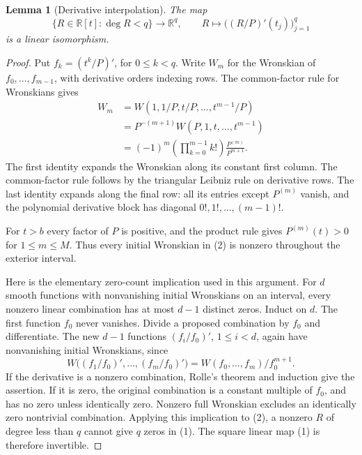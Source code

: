 \documentclass[11pt]{article}
\newtheorem{lemma}{Lemma}
\begin{document}
\begin{lemma}[Derivative interpolation]
The map
\[
 \{R\in\mathbb R[t]:\deg R<q\}\longrightarrow\mathbb R^q,
 \qquad R\longmapsto\bigl((R/P)'(t_j)\bigr)_{j=1}^q
                                                               \tag{1}
\]
is a linear isomorphism.
\end{lemma}
\begin{proof}
Put $f_k=(t^k/P)'$, for $0\leq k<q$. Write $W_m$ for the Wronskian
of $f_0,\ldots,f_{m-1}$, with derivative orders indexing rows.
The common-factor rule for Wronskians gives
\[
 \begin{aligned}
 W_m&=W(1,1/P,t/P,\ldots,t^{m-1}/P)\\
 &=P^{-(m+1)}W(P,1,t,\ldots,t^{m-1})\\
 &=(-1)^m\left(\prod_{k=0}^{m-1}k!\right)
                    \frac{P^{(m)}}{P^{m+1}}.                 \tag{2}
 \end{aligned}
\]
The first identity expands the Wronskian along its constant first
column. The common-factor rule follows by the triangular Leibniz rule
on derivative rows. The last identity expands along the final row:
all its entries except $P^{(m)}$ vanish, and the polynomial derivative
block has diagonal $0!,1!,\ldots,(m-1)!$.

For $t>b$ every factor of $P$ is positive, and the product rule gives
$P^{(m)}(t)>0$ for $1\leq m\leq M$. Thus every initial Wronskian
in (2) is nonzero throughout the exterior interval.

Here is the elementary zero-count implication used in this argument.
For $d$ smooth functions with nonvanishing initial Wronskians on an
interval, every nonzero linear combination has at most $d-1$ distinct
zeros. Induct on $d$. The first function $f_0$ never vanishes. Divide
a proposed combination by $f_0$ and differentiate. The new $d-1$
functions $(f_i/f_0)'$, $1\leq i<d$, again have nonvanishing initial
Wronskians, since
\[
 W\bigl((f_1/f_0)',\ldots,(f_m/f_0)'\bigr)
                  =W(f_0,\ldots,f_m)/f_0^{m+1}.
\]
If the derivative is a nonzero combination, Rolle's theorem and
induction give the assertion. If it is zero, the original combination
is a constant multiple of $f_0$, and has no zero unless identically
zero. Nonzero full Wronskian excludes an identically zero nontrivial
combination. Applying this implication to (2), a nonzero $R$ of
degree less than $q$ cannot give $q$ zeros in (1). The square linear
map (1) is therefore invertible.
\end{proof}
\end{document}
